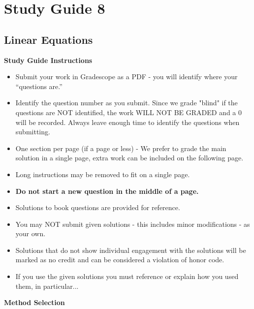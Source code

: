 \clearpage
\chapter{Study Guide 8}

\section{Linear Equations}

\begin{center}
    \large{\textbf{Study Guide Instructions}}
\end{center}


\begin{itemize}
    \item Submit your work in Gradescope as a PDF - you will identify where your “questions are.”
    \item Identify the question number as you submit.  Since we grade "blind" if the questions are NOT identified, the work WILL NOT BE GRADED and a 0 will be recorded. Always leave enough time to 
    identify the questions when submitting.
    \item One section per page (if a page or less) - We prefer to grade the main solution in a single page, extra work can be included on the following page.
    \item Long instructions may be removed to fit on a single page.
    \item \textbf{Do not start a new question in the middle of a page.}
    \item Solutions to book questions are provided for reference.
    \item You may NOT submit given solutions - this includes minor modifications - as your own.
    \item Solutions that do not show individual engagement with the solutions will be marked as no credit and can be considered a violation of honor code.
    \item If you use the given solutions you must reference or explain how you used them, in particular...
\end{itemize}


\begin{center}
    \large{\textbf{Method Selection}}
\end{center}


